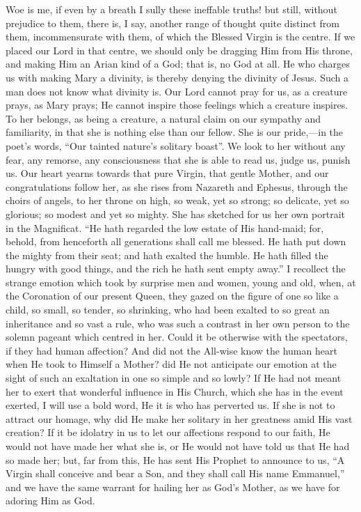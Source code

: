 Woe is me, if even by a breath I sully these ineffable truths! but
still, without prejudice to them, there is, I say, another range of
thought quite distinct from them, incommensurate with them, of which the
Blessed Virgin is the centre. If we placed our Lord in that centre,
we should only be dragging Him from His throne, and making Him an Arian
kind of a God; that is, no God at all. He who charges us with making
Mary a divinity, is thereby denying the divinity of Jesus. Such a man
does not know what divinity is. Our Lord cannot pray for us, as a
creature prays, as Mary prays; He cannot inspire those feelings which a
creature inspires. To her belongs, as being a creature, a natural claim
on our sympathy and familiarity, in that she is nothing else than our
fellow. She is our pride,—in the poet's words, ``Our tainted
nature's solitary boast''. We look to her without any fear, any
remorse, any consciousness that she is able to read us, judge us, punish
us. Our heart yearns towards that pure Virgin, that gentle Mother, and
our congratulations follow her, as she rises from Nazareth and Ephesus,
through the choirs of angels, to her throne on high, so weak, yet so
strong; so delicate, yet so glorious; so modest and yet so mighty. She
has sketched for us her own portrait in the Magnificat. ``He hath
regarded the low estate of His hand-maid; for, behold, from henceforth
all generations shall call me blessed. He hath put down the mighty from
their seat; and hath exalted the humble. He hath filled the hungry with
good things, and the rich he hath sent empty away.'' I recollect the
strange emotion which took by surprise men and women, young and old,
when, at the Coronation of our present Queen, they gazed on the figure
of one so like a child, so small, so tender, so shrinking, who had been
exalted to so great an inheritance and so vast a rule, who was such
a contrast in her own person to the solemn pageant which centred in her.
Could it be otherwise with the spectators, if they had human affection?
And did not the All-wise know the human heart when He took to Himself a
Mother? did He not anticipate our emotion at the sight of such an
exaltation in one so simple and so lowly? If He had not meant her to
exert that wonderful influence in His Church, which she has in the event
exerted, I will use a bold word, He it is who has perverted us. If she
is not to attract our homage, why did He make her solitary in her
greatness amid His vast creation? If it be idolatry in us to let our
affections respond to our faith, He would not have made her what she is,
or He would not have told us that He had so made her; but, far from
this, He has sent His Prophet to announce to us, ``A Virgin shall
conceive and bear a Son, and they shall call His name Emmanuel,''
and we have the same warrant for hailing her as God's Mother, as we have
for adoring Him as God.

